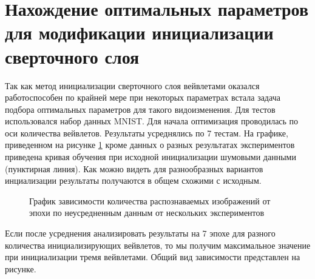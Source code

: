 \documentclass[utf8,usehyperref,14pt]{G7-32}
\begin{document}
\section{Нахождение оптимальных параметров для модификации инициализации сверточного слоя}
Так как метод инициализации сверточного слоя вейвлетами оказался работоспособен по крайней мере при некоторых параметрах встала задача подбора оптимальных параметров для такого видоизменения. Для тестов использовался набор данных MNIST. Для начала оптимизация проводилась по оси количества вейвлетов. Результаты усреднялись по 7 тестам. На графике, приведенном на рисунке \ref{conwave_different_count} кроме данных о разных результатах экспериментов приведена кривая обучения при исходной инициализации шумовыми данными (пунктирная линия). Как можно видеть для разнообразных вариантов инциализации результаты получаются в общем схожими с исходным.
\begin{figure}[H]
  \caption{График зависимости количества распознаваемых изображений от эпохи по неусредненным данным от нескольких экспериментов}\label{conwave_different_count}
\end{figure}
Если после усреднения анализировать результаты на 7 эпохе для разного количества инициализирующих вейвлетов, то мы получим максимальное значение при инициализации тремя вейвлетами. Общий вид зависимости представлен на рисунке.
\end{document}
